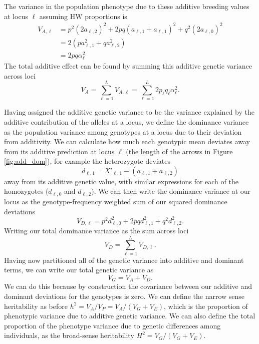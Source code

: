 The variance in the population phenotype due to these
additive breeding values at locus $\ell$ assuming HW proportions is
\begin{align}
V_{A, \ell} &= p^2 (2a_{\ell,2})^2 + 2pq (a_{\ell,1}+a_{\ell,1})^2 + q^2
(2a_{\ell,0})^2 \nonumber \\
& = 2(p a_{\ell, 1}^2 + q a_{\ell, 2}^2 ) \nonumber \\
& = 2pq \alpha_{\ell}^2
\end{align}
The total additive effect can
be found by summing this additive genetic variance across loci
\begin{equation}
V_A = \sum_{\ell=1}^{L} V_{A, \ell} = \sum_{\ell=1}^{L}
2p_{\ell}q_{\ell} \alpha_{\ell}^2.
\end{equation}

Having assigned the additive genetic variance to be the variance
explained by the additive contribution of the alleles at a locus, we
define the dominance variance as the population variance among
genotypes at a locus due to their deviation from additivity.
We can calculate how much each genotypic mean deviates away from its
additive prediction at locus $\ell$ (the length of the arrows in
Figure \ref{fig:add_dom}), for example the heterozygote deviates 
\begin{equation}
d_{\ell,1} =\overline{X}'_{\ell,1}  - (a_{\ell,1}+ a_{\ell,2})
\end{equation}
away from its additive genetic value, with similar expressions for
each of the homozygotes ($d_{\ell,0}$ and $d_{\ell,2}$). We can then write the dominance variance at
our locus as the genotype-frequency weighted sum of our squared
dominance deviations
\begin{equation}
V_{D,\ell} = p^2 d_{\ell,0}^2+ 2pq d_{\ell,1}^2+ q^2 d_{\ell,2}^2.
\end{equation}
Writing our total dominance variance as the sum across loci 
\begin{equation}
V_D = \sum_{\ell=1}^{L}  V_{D,\ell}. 
\end{equation}
Having now partitioned all of the genetic variance into additive and
dominant terms, we can write our total genetic variance as 
\begin{equation}
V_{G} = V_A+V_D.
\end{equation}
We can do this because by construction the covariance between our
additive and dominant deviations for the genotypes is zero. We can
define the narrow sense heritability as before
$h^2=V_A/V_P=V_A/(V_G+V_E)$, which is the proportion of phenotypic
variance due to additive genetic variance. We can also define the 
total proportion of the phenotype variance due to genetic differences
among individuals, as the broad-sense heritability $H^2 =
V_G/(V_G+V_E)$. \\

